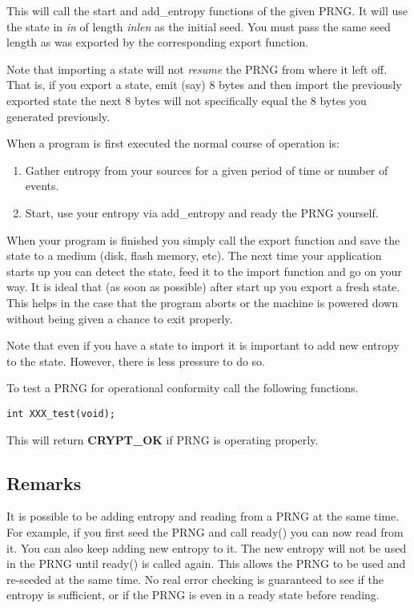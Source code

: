 \documentclass[synpaper]{book}
\begin{document}
This will call the start and add\_entropy functions of the given PRNG.  It will use the state in
\textit{in} of length \textit{inlen} as the initial seed.  You must pass the same seed length as was exported
by the corresponding export function.

Note that importing a state will not \textit{resume} the PRNG from where it left off.  That is, if you export
a state, emit (say) 8 bytes and then import the previously exported state the next 8 bytes will not
specifically equal the 8 bytes you generated previously.

When a program is first executed the normal course of operation is:

\begin{enumerate}
   \item Gather entropy from your sources for a given period of time or number of events.
   \item Start, use your entropy via add\_entropy and ready the PRNG yourself.
\end{enumerate}

When your program is finished you simply call the export function and save the state to a medium (disk,
flash memory, etc).  The next time your application starts up you can detect the state, feed it to the
import function and go on your way.  It is ideal that (as soon as possible) after start up you export a
fresh state.  This helps in the case that the program aborts or the machine is powered down without
being given a chance to exit properly.

Note that even if you have a state to import it is important to add new entropy to the state.  However,
there is less pressure to do so.

To test a PRNG for operational conformity call the following functions.

\begin{verbatim}
int XXX_test(void);
\end{verbatim}

This will return \textbf{CRYPT\_OK} if PRNG is operating properly.

\subsection{Remarks}

It is possible to be adding entropy and reading from a PRNG at the same time.  For example, if you first seed the PRNG
and call ready() you can now read from it.  You can also keep adding new entropy to it.  The new entropy will not be used
in the PRNG until ready() is called again.  This allows the PRNG to be used and re-seeded at the same time.  No real error
checking is guaranteed to see if the entropy is sufficient, or if the PRNG is even in a ready state before reading.
\end{document}

